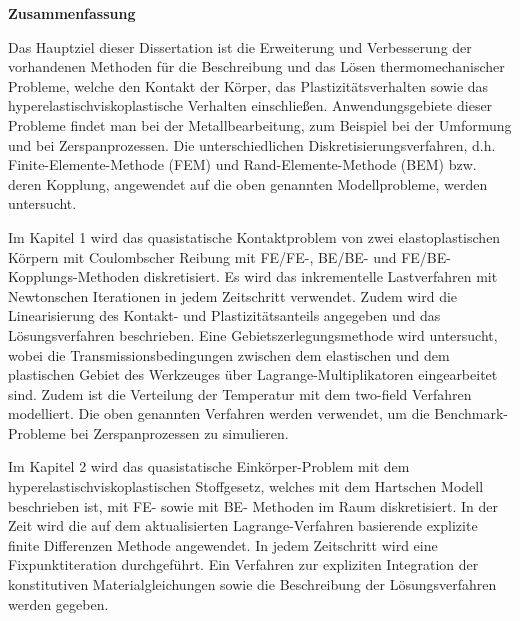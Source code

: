 
\vspace*{-25.0mm}



\begin{center}
\sf \large
\textbf{Zusammenfassung}
\end{center}
\vspace*{-3.0mm}
Das Hauptziel dieser Dissertation ist die Erweiterung und  Verbesserung der vorhandenen Methoden für die Beschreibung und das Lösen thermomechanischer Probleme, welche den  Kontakt der Körper, das Plastizitätsverhalten sowie das hyperelastischviskoplastische Verhalten  einschließen. Anwendungsgebiete dieser Probleme findet man bei  der Metallbearbeitung, zum Beispiel bei der Umformung  und bei Zerspanprozessen. Die unterschiedlichen Diskretisierungsverfahren, d.h. Finite-Elemente-Methode (FEM) und Rand-Elemente-Methode (BEM) bzw. deren Kopplung, angewendet  auf die oben genannten Modellprobleme, werden untersucht.

Im Kapitel 1 wird das quasistatische Kontaktproblem von zwei elastoplastischen Körpern  mit Coulombscher Reibung mit FE/FE-, BE/BE- und FE/BE- Kopplungs-Methoden diskretisiert. Es wird das inkrementelle Lastverfahren mit Newtonschen Iterationen in jedem Zeitschritt verwendet. Zudem wird die Linearisierung des Kontakt- und Plastizitätsanteils angegeben und das Lösungsverfahren beschrieben. Eine Gebietszerlegungsmethode wird untersucht, wobei die Transmissionsbedingungen zwischen dem elastischen und dem plastischen Gebiet des Werkzeuges über   Lagrange-Multiplikatoren eingearbeitet sind. Zudem ist  die Verteilung der Temperatur mit dem two-field Verfahren modelliert. Die oben genannten Verfahren werden verwendet, um die Benchmark-Probleme bei Zerspanprozessen zu simulieren.

Im Kapitel 2 wird das quasistatische Einkörper-Problem mit dem hyperelastischviskoplastischen Stoffgesetz,  welches mit  dem Hartschen Modell beschrieben ist,  mit FE- sowie mit BE- Methoden im Raum diskretisiert. In der Zeit wird die   auf dem aktualisierten Lagrange-Verfahren basierende explizite  finite Differenzen Methode  angewendet. In jedem Zeitschritt wird eine Fixpunktiteration durchgeführt. Ein  Verfahren zur expliziten Integration der konstitutiven  Materialgleichungen sowie die Beschreibung der Lösungsverfahren werden gegeben. 


